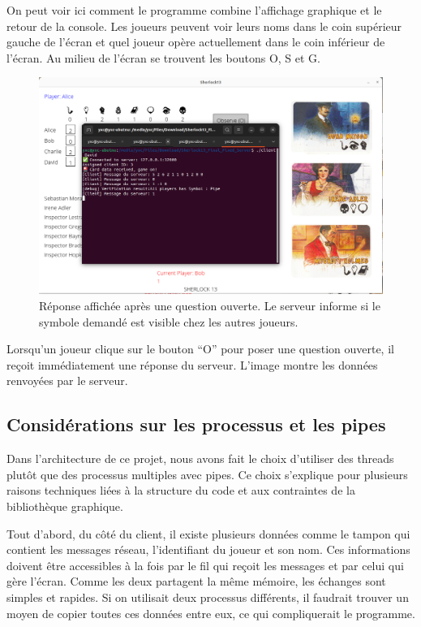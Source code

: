 \documentclass{article}
\begin{document}
On peut voir ici comment le programme combine l'affichage graphique et le retour de la console. 
Les joueurs peuvent voir leurs noms dans le coin supérieur gauche de l'écran et quel joueur opère actuellement dans le coin inférieur de l'écran. Au milieu de l'écran se trouvent les boutons O, S et G.

\begin{figure}[H]
    \centering
    \includegraphics[width=0.9\linewidth]{images/message_returned.png}
    \caption{Réponse affichée après une question ouverte. Le serveur informe si le symbole demandé est visible chez les autres joueurs.}
\end{figure}
    
Lorsqu'un joueur clique sur le bouton “O” pour poser une question ouverte, il reçoit immédiatement une réponse du serveur. 
L'image montre les données renvoyées par le serveur.
    
\subsection{Considérations sur les processus et les pipes}

Dans l'architecture de ce projet, nous avons fait le choix d'utiliser des threads plutôt que des processus multiples avec pipes. Ce choix s'explique pour plusieurs raisons techniques liées à la structure du code et aux contraintes de la bibliothèque graphique.

Tout d'abord, du côté du client, il existe plusieurs données comme le tampon qui contient les messages réseau, l'identifiant du joueur et son nom. Ces informations doivent être accessibles à la fois par le fil qui reçoit les messages et par celui qui gère l'écran. Comme les deux partagent la même mémoire, les échanges sont simples et rapides. Si on utilisait deux processus différents, il faudrait trouver un moyen de copier toutes ces données entre eux, ce qui compliquerait le programme.
\end{document}
